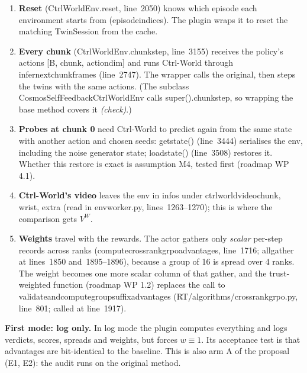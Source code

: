 \documentclass[11pt,a4paper]{article}
\newcommand{\chk}{\textit{(check)}}
\newcommand{\code}[1]{{\small\ttfamily\begingroup\def\_{\textunderscore\allowbreak}\def\/{/\allowbreak}#1\endgroup}}
\newcommand{\VW}{V^{W}}
\begin{document}
\begin{enumerate}
\item \textbf{Reset} (\code{CtrlWorldEnv.reset}, line~2050) knows which episode each environment starts from (\code{episode\_indices}). The plugin wraps it to reset the matching \code{TwinSession} from the cache.
\item \textbf{Every chunk} (\code{CtrlWorldEnv.chunk\_step}, line~3155) receives the policy's actions \code{[B, chunk, action\_dim]} and runs Ctrl-World through \code{\_infer\_next\_chunk\_frames} (line~2747). The wrapper calls the original, then steps the twins with the same actions. (The subclass \code{CosmosSelfFeedbackCtrlWorldEnv} calls \code{super().chunk\_step}, so wrapping the base method covers it \chk.)
\item \textbf{Probes at chunk 0} need Ctrl-World to predict again from the same state with another action and chosen seeds: \code{get\_state()} (line~3444) serialises the env, including the noise generator state; \code{load\_state()} (line~3508) restores it. Whether this restore is exact is assumption M4, tested first (roadmap WP 4.1).
\item \textbf{Ctrl-World's video} leaves the env in \code{infos} under \code{ctrl\_world\_video\_chunk}, \code{\_wrist}, \code{\_extra} (read in \code{env\_worker.py}, lines~1263--1270); this is where the comparison gets $\VW$.
\item \textbf{Weights} travel with the rewards. The actor gathers only \emph{scalar} per-step records across ranks (\code{\_compute\_cross\_rank\_grpo\_advantages}, line~1716; \code{all\_gather} at lines~1850 and~1895--1896), because a group of 16 is spread over 4 ranks. The weight becomes one more scalar column of that gather, and the trust-weighted function (roadmap WP 1.2) replaces the call to \code{validate\_and\_compute\_group\_suffix\_advantages} (\code{RT\/algorithms\/cross\_rank\_grpo.py}, line~801; called at line~1917).
\end{enumerate}

\textbf{First mode: log only.} In \code{log} mode the plugin computes everything and logs verdicts, scores, spreads and weights, but forces $w\equiv1$. Its acceptance test is that advantages are bit-identical to the baseline. This is also arm A of the proposal (E1, E2): the audit runs on the original method.
\end{document}

